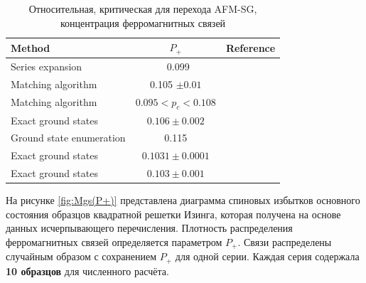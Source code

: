 \documentclass[utf8, babel, sor, jor, amsmath, amssymb, reprint]{elsarticle} %
\begin{document}
\begin{table}[!h]
	\begin{tabular}{|l|c|l|}
		\hline
		Method                                   & $P_{+}$                                       & Reference                                           
		\\ \hline
		Series expansion 								& ~0.099                                  & \cite{PhysRevB.19.260}    \\ \hline
	     Matching algorithm                            & 
	     0.105 $\pm 0.01$                                        & \cite{H_Freund_1989} \\ \hline
		Matching algorithm                      & 
		$0.095<p_c<0.108$                                          & \cite{BENDISCH1994139}      \\ \hline
		Exact ground states                       & 
		$0.106 \pm 0.002$                               & \cite{N.Kawashima_1997}     \\ \hline
		Ground state enumeration                             & 0.115                                          & \cite{PhysRevE.58.1502} \\ \hline
    	Exact ground states        & 
		$0.1031\pm0.0001$                                          & \cite{WANG200331}   \\ \hline
		Exact ground states   & $0.103\pm0.001$                                       & \cite{amoruso2004domain} 
		    \\ \hline
			
	\end{tabular}
	\caption{Относительная, критическая для перехода AFM-SG, концентрация ферромагнитных связей}
	\label{tab:lit_phase}
\end{table}

На рисунке \ref{fig:Mgs(P+)} представлена диаграмма спиновых избытков основного состояния образцов квадратной решетки Изинга, которая получена на основе данных исчерпывающего перечисления. Плотность распределения ферромагнитных связей определяется параметром $P_+$. Связи распределены случайным образом с сохранением $P_+$ для одной серии. Каждая серия содержала \textbf{10 образцов} для численного расчёта. 
\end{document}
